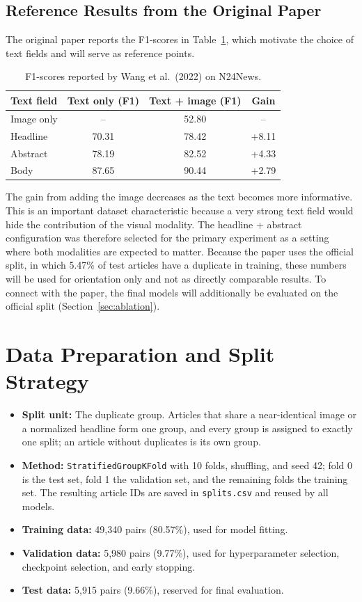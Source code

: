 \documentclass[11pt,a4paper]{article}
\begin{document}
\subsection{Reference Results from the Original Paper}

The original paper reports the F1-scores in Table~\ref{tab:paper}, which motivate the choice of text fields and will serve as reference points.

\begin{table}[htbp]
\centering
\caption{F1-scores reported by Wang et al.\ (2022) on N24News.}\label{tab:paper}
\begin{tabular}{lccc}
\toprule
\textbf{Text field} & \textbf{Text only (F1)} & \textbf{Text + image (F1)} & \textbf{Gain}\\
\midrule
Image only & -- & 52.80 & --\\
Headline & 70.31 & 78.42 & +8.11\\
Abstract & 78.19 & 82.52 & +4.33\\
Body & 87.65 & 90.44 & +2.79\\
\bottomrule
\end{tabular}
\end{table}

The gain from adding the image decreases as the text becomes more informative. This is an important dataset characteristic because a very strong text field would hide the contribution of the visual modality. The headline + abstract configuration was therefore selected for the primary experiment as a setting where both modalities are expected to matter. Because the paper uses the official split, in which 5.47\% of test articles have a duplicate in training, these numbers will be used for orientation only and not as directly comparable results. To connect with the paper, the final models will additionally be evaluated on the official split (Section~\ref{sec:ablation}).

\section{Data Preparation and Split Strategy}\label{sec:split}

\begin{itemize}
\item \textbf{Split unit:} The duplicate group. Articles that share a near-identical image or a normalized headline form one group, and every group is assigned to exactly one split; an article without duplicates is its own group.
\item \textbf{Method:} \texttt{StratifiedGroupKFold} with 10 folds, shuffling, and seed 42; fold 0 is the test set, fold 1 the validation set, and the remaining folds the training set. The resulting article IDs are saved in \texttt{splits.csv} and reused by all models.
\item \textbf{Training data:} 49,340 pairs (80.57\%), used for model fitting.
\item \textbf{Validation data:} 5,980 pairs (9.77\%), used for hyperparameter selection, checkpoint selection, and early stopping.
\item \textbf{Test data:} 5,915 pairs (9.66\%), reserved for final evaluation.
\end{itemize}
\end{document}
